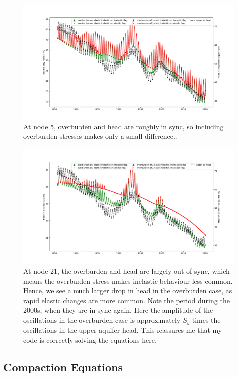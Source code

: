 \documentclass{article}
\begin{document}
\begin{figure}
\includegraphics[width=\linewidth]{BasicIllustration_ElasticInelastic_n5.pdf}
\caption{At node 5, overburden and head are roughly in sync, so including overburden stresses makes only a small difference..}
\label{fig:overburden4}
\end{figure}

\begin{figure}
\includegraphics[width=\linewidth]{BasicIllustration_ElasticInelastic_n21.pdf}
\caption{At node 21, the overburden and head are largely out of sync, which means the overburden stress makes inelastic behaviour less common. Hence, we see a much larger drop in head in the overburden case, as rapid elastic changes are more common. Note the period during the 2000s, when they are in sync again. Here the amplitude of the oscillations in the overburden case is approximately $S_y$ times the oscillations in the upper aquifer head. This reassures me that my code is correctly solving the equations here.}
\label{fig:overburden5}
\end{figure}


\subsection{Compaction Equations}
\end{document}
